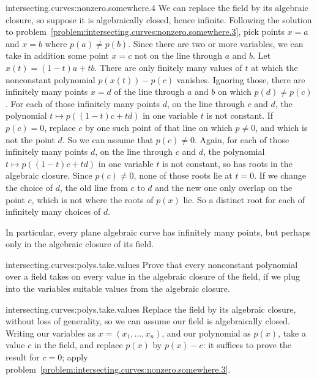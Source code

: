 \begin{answer}{intersecting.curves:nonzero.somewhere.4}
We can replace the field by its algebraic closure, so suppose it is algebraically closed, hence infinite.
Following the solution to problem~\vref{problem:intersecting.curves:nonzero.somewhere.3}, pick points \(x=a\) and \(x=b\) where \(p(a)\ne p(b)\). 
Since there are two or more variables, we can take in addition some point \(x=c\) not on the line through \(a\) and \(b\).
Let \(x(t)=(1-t)a+tb\).
There are only finitely many values of \(t\) at which the nonconstant polynomial \(p(x(t))-p(c)\) vanishes.
Ignoring those, there are infinitely many points \(x=d\) of the line through \(a\) and \(b\) on which \(p(d)\ne p(c)\).
For each of those infinitely many points \(d\), on the line through \(c\) and \(d\), the polynomial \(t\mapsto p((1-t)c+td)\) in one variable \(t\) is not constant.
If \(p(c)=0\), replace \(c\) by one such point of that line on which \(p\ne 0\), and which is not the point \(d\).
So we can assume that \(p(c)\ne 0\).
Again, for each of those infinitely many points \(d\), on the line through \(c\) and \(d\), the polynomial \(t\mapsto p((1-t)c+td)\) in one variable \(t\) is not constant, so has roots in the algebraic closure.
Since \(p(c)\ne 0\), none of those roots lie at \(t=0\).
If we change the choice of \(d\), the old line from \(c\) to \(d\) and the new one only overlap on the point \(c\), which is not where the roots of \(p(x)\) lie.
So a distinct root for each of infinitely many choices of \(d\).
\end{answer}
In particular, every plane algebraic curve has infinitely many points, but perhaps only in the algebraic closure of its field.
\begin{problem}{intersecting.curves:polys.take.values}
Prove that every nonconstant polynomial over a field takes on every value in the algebraic closure of the field, if we plug into the variables suitable values from the algebraic closure.
\end{problem}
\begin{answer}{intersecting.curves:polys.take.values}
Replace the field by its algebraic closure, without loss of generality, so we can assume our field is algebraically closed.
Writing our variables as \(x=(x_1,\dots,x_n)\), and our polynomial as \(p(x)\),  take a value \(c\) in the field, and replace \(p(x)\) by \(p(x)-c\): it suffices to prove the result for \(c=0\); apply problem~\vref{problem:intersecting.curves:nonzero.somewhere.3}.
\end{answer}

